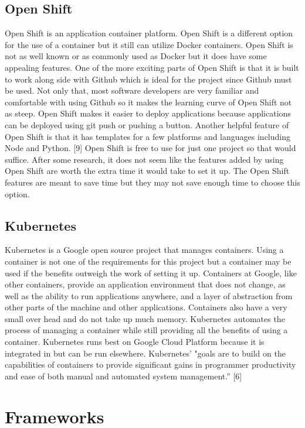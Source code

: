 \documentclass[letterpaper,10pt,draftclsnofoot,onecolumn,]{article}
\begin{document}
\subsection{Open Shift}
Open Shift is an application container platform. Open Shift is a different option for the use of a container but it still can utilize Docker containers. Open Shift is not as well known or as commonly used as Docker but it does have some appealing features. One of the more exciting parts of Open Shift is that it is built to work along side with Github which is ideal for the project since Github must be used. Not only that, most software developers are very familiar and comfortable with using Github so it makes the learning curve of Open Shift not as steep. Open Shift makes it easier to deploy applications because applications can be deployed using git push or pushing a button. Another helpful feature of Open Shift is that it has templates for a few platforms and languages including Node and Python. [9] Open Shift is free to use for just one project so that would suffice. After some research, it does not seem like the features added by using Open Shift are worth the extra time it would take to set it up. The Open Shift features are meant to save time but they may not save enough time to choose this option.

\subsection{Kubernetes}
Kubernetes is a Google open source project that manages containers. Using a container is not one of the requirements for this project but a container may be used if the benefits outweigh the work of setting it up. Containers at Google, like other containers, provide an application environment that does not change, as well as the ability to run applications anywhere, and a layer of abstraction from other parts of the machine and other applications. Containers also have a very small over head and do not take up much memory. Kubernetes automates the process of managing a container while still providing all the benefits of using a container. Kubernetes runs best on Google Cloud Platform because it is integrated in but can be run elsewhere. Kubernetes' "goals are to build on the capabilities of containers to provide significant gains in programmer productivity and ease of both manual and automated system management.” [6]

\section{Frameworks}
\end{document}
